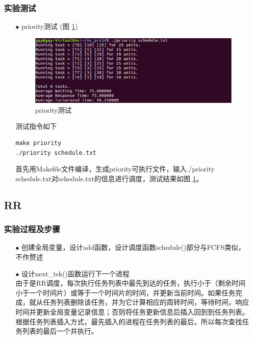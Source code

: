 \documentclass{article}
\begin{document}
\subsubsection{实验测试}
\begin{itemize}
\item[$\bullet$]priority测试 (图 \ref{priority测试})
\begin{figure}[htbp]
		\centering
		\includegraphics{p}
		\caption{priority测试} \label{priority测试}
\end{figure}

测试指令如下
\begin{lstlisting}[language={[ANSI]C}]
make priority
./priority schedule.txt
\end{lstlisting}
首先用Makefile文件编译，生成priority可执行文件，输入./priority schedule.txt对schedule.txt的信息进行调度，测试结果如图 \ref{priority测试}。
\end{itemize}
\subsection{RR}
\subsubsection{实验过程及步骤}
\begin{itemize}
\item[$\bullet$]创建全局变量，设计add函数，设计调度函数schedule()部分与FCFS类似，不作赘述
\item[$\bullet$]设计next\_tsk()函数运行下一个进程\\
由于是RR调度，每次执行任务列表中最先到达的任务，执行小于（剩余时间小于一个时间片）或等于一个时间片的时间，并更新当前时间。如果任务完成，就从任务列表删除该任务，并为它计算相应的周转时间，等待时间，响应时间并更新全局变量记录信息；否则将任务更新信息后插入回到到任务列表。根据任务列表插入方式，最先插入的进程在任务列表的最后，所以每次查找任务列表的最后一个并执行。
\end{itemize}
\end{document}
